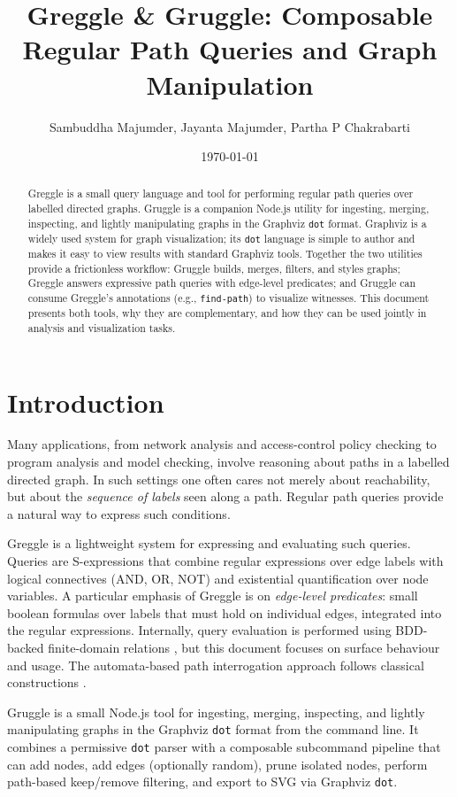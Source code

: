 \documentclass[11pt]{article}
\title{Greggle \& Gruggle: Composable Regular Path Queries and Graph Manipulation}
\author{Sambuddha Majumder, Jayanta Majumder, Partha P Chakrabarti}
\date{\today}
\begin{document}
\maketitle

\begin{abstract}
Greggle is a small query language and tool for performing regular path queries over labelled directed graphs. Gruggle is a companion Node.js utility for ingesting, merging, inspecting, and lightly manipulating graphs in the Graphviz \texttt{dot} format. Graphviz is a widely used system for graph visualization; its \texttt{dot} language is simple to author and makes it easy to view results with standard Graphviz tools. Together the two utilities provide a frictionless workflow: Gruggle builds, merges, filters, and styles graphs; Greggle answers expressive path queries with edge-level predicates; and Gruggle can consume Greggle's annotations (e.g., \texttt{find-path}) to visualize witnesses. This document presents both tools, why they are complementary, and how they can be used jointly in analysis and visualization tasks.
\end{abstract}

\section{Introduction}

Many applications, from network analysis and access-control policy checking to program analysis and model checking, involve reasoning about paths in a labelled directed graph. In such settings one often cares not merely about reachability, but about the \emph{sequence of labels} seen along a path. Regular path queries provide a natural way to express such conditions.

Greggle is a lightweight system for expressing and evaluating such queries. Queries are S-expressions that combine regular expressions over edge labels with logical connectives (AND, OR, NOT) and existential quantification over node variables. A particular emphasis of Greggle is on \emph{edge-level predicates}: small boolean formulas over labels that must hold on individual edges, integrated into the regular expressions. Internally, query evaluation is performed using BDD-backed finite-domain relations \cite{bryant1986graph}, but this document focuses on surface behaviour and usage. The automata-based path interrogation approach follows classical constructions \cite{vardi2007automata}.

Gruggle is a small Node.js tool for ingesting, merging, inspecting, and lightly manipulating graphs in the Graphviz \texttt{dot} format from the command line. It combines a permissive \texttt{dot} parser with a composable subcommand pipeline that can add nodes, add edges (optionally random), prune isolated nodes, perform path-based keep/remove filtering, and export to SVG via Graphviz \texttt{dot}.
\end{document}
